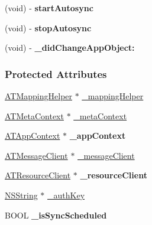 \begin{DoxyCompactItemize}
\item 
\hypertarget{interface_a_t_synchronizer_a237c7017d5b328901ef056c4174b1284}{
(void) -\/ {\bfseries startAutosync}}
\label{interface_a_t_synchronizer_a237c7017d5b328901ef056c4174b1284}

\item 
\hypertarget{interface_a_t_synchronizer_a50d1711cbe2f564ea1633e80fbc00dd7}{
(void) -\/ {\bfseries stopAutosync}}
\label{interface_a_t_synchronizer_a50d1711cbe2f564ea1633e80fbc00dd7}

\item 
\hypertarget{interface_a_t_synchronizer_a311d78f60c5b19b749bcc47ec43aa81b}{
(void) -\/ {\bfseries \_\-didChangeAppObject:}}
\label{interface_a_t_synchronizer_a311d78f60c5b19b749bcc47ec43aa81b}

\end{DoxyCompactItemize}
\subsubsection*{Protected Attributes}
\begin{DoxyCompactItemize}
\item 
\hyperlink{interface_a_t_mapping_helper}{ATMappingHelper} $\ast$ \hyperlink{interface_a_t_synchronizer_a31d09b73a13ca9815cd0f62d60dbc373}{\_\-mappingHelper}
\item 
\hyperlink{interface_a_t_meta_context}{ATMetaContext} $\ast$ \hyperlink{interface_a_t_synchronizer_a14e16b95fa385616596db1b540fb8280}{\_\-metaContext}
\item 
\hypertarget{interface_a_t_synchronizer_a4d68957b743ed4634a79496c9ce4857e}{
\hyperlink{interface_a_t_app_context}{ATAppContext} $\ast$ {\bfseries \_\-appContext}}
\label{interface_a_t_synchronizer_a4d68957b743ed4634a79496c9ce4857e}

\item 
\hyperlink{interface_a_t_message_client}{ATMessageClient} $\ast$ \hyperlink{interface_a_t_synchronizer_a7540768d28730fa0da9a29c8bd3db701}{\_\-messageClient}
\item 
\hypertarget{interface_a_t_synchronizer_ac8d7d4aca2cae90b6b218443d9dbcb77}{
\hyperlink{interface_a_t_resource_client}{ATResourceClient} $\ast$ {\bfseries \_\-resourceClient}}
\label{interface_a_t_synchronizer_ac8d7d4aca2cae90b6b218443d9dbcb77}

\item 
\hyperlink{class_n_s_string}{NSString} $\ast$ \hyperlink{interface_a_t_synchronizer_aff441de7abd4bb9fb6fb62ebfb36c072}{\_\-authKey}
\item 
\hypertarget{interface_a_t_synchronizer_a2f1074693dc133a3a76305842905cbe7}{
BOOL {\bfseries \_\-isSyncScheduled}}
\label{interface_a_t_synchronizer_a2f1074693dc133a3a76305842905cbe7}

\end{DoxyCompactItemize}
